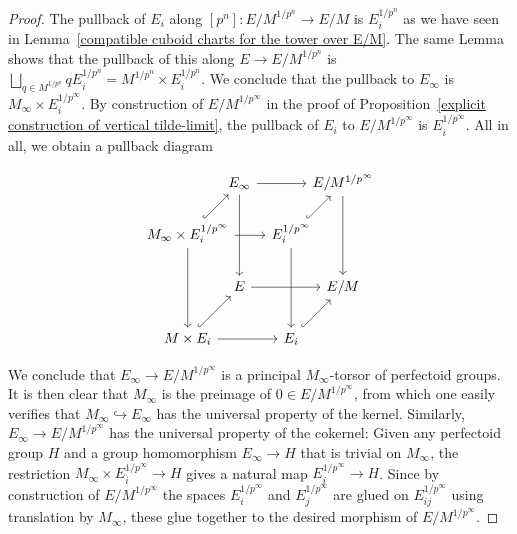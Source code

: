 \documentclass[10pt,oneside]{amsart}
\theoremstyle{definition}
\begin{document}
\begin{proof}
		The pullback of $E_i$ along $[p^n]:E/M^{1/p^n}\rightarrow E/M$ is $E_i^{1/p^n}$ as we have seen in Lemma~\ref{compatible cuboid charts for the tower over E/M}. The same Lemma shows that the pullback of this along $E\rightarrow E/M^{1/p^n}$ is $\bigsqcup_{q\in M^{1/p^n}}qE_i^{1/p^n}=M^{1/p^n}\times E_i^{1/p^n}$.
		We conclude that the pullback to $E_\infty$ is $M_\infty\times E_i^{1/p^\infty}$. 
		By construction of $E/M^{1/p^\infty}$ in the proof of Proposition~\ref{explicit construction of vertical tilde-limit}, the pullback of $E_i$ to $E/M^{1/p^\infty}$ is $E_i^{1/p^\infty}$. All in all, we obtain a pullback diagram
		\begin{center}
		\begin{equation}\label{pullback diagram covering map E inf to E/M^1/p^inf }
		\begin{tikzcd}[column sep={1.3cm,between origins},row sep={1.3cm,between origins}]
			& E_\infty \arrow[dd] \arrow[rr] &  & E/M^{1/p^\infty} \arrow[dd] \\
			M_\infty\times E_i^{1/p^\infty} \arrow[dd] \arrow[rr] \arrow[ru, hook] &  & E_i^{1/p^\infty} \arrow[dd] \arrow[ru, hook] &  \\
			& E \arrow[rr] &  & E/M \\
			M\times E_i \arrow[rr] \arrow[ru, hook] &  & E_i \arrow[ru, hook] & 
		\end{tikzcd}
		\end{equation}
		\end{center}
		We conclude that $E_\infty \rightarrow E/M^{1/p^\infty}$ is a principal $M_\infty$-torsor of perfectoid groups. It is then clear that $M_\infty$ is the preimage of $0\in E/M^{1/p^\infty}$, from which one easily verifies that $M_\infty\hookrightarrow E_\infty$ has the universal property of the kernel.
		Similarly, $E_\infty \rightarrow E/M^{1/p^\infty}$ has the universal property of the cokernel: Given any perfectoid group $H$ and a group homomorphism $E_\infty\rightarrow H$ that is trivial on $M_\infty$, the restriction $M_\infty\times E_i^{1/p^\infty}\rightarrow H$ gives a natural map $E_i^{1/p^\infty}\rightarrow H$. Since by construction of $E/M^{1/p^\infty}$ the spaces $E_i^{1/p^\infty}$ and $E_j^{1/p^\infty}$ are glued on $E_{ij}^{1/p^\infty}$ using translation by $M_\infty$, these glue together to the desired morphism of $E/M^{1/p^\infty}$.
	\end{proof}
	
\end{document}
